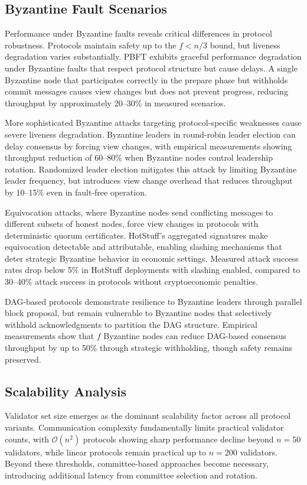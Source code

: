 \subsection{Byzantine Fault Scenarios}

Performance under Byzantine faults reveals critical differences in protocol robustness. Protocols maintain safety up to the $f < n/3$ bound, but liveness degradation varies substantially. PBFT exhibits graceful performance degradation under Byzantine faults that respect protocol structure but cause delays. A single Byzantine node that participates correctly in the prepare phase but withholds commit messages causes view changes but does not prevent progress, reducing throughput by approximately 20--30\% in measured scenarios.

More sophisticated Byzantine attacks targeting protocol-specific weaknesses cause severe liveness degradation. Byzantine leaders in round-robin leader election can delay consensus by forcing view changes, with empirical measurements showing throughput reduction of 60--80\% when Byzantine nodes control leadership rotation. Randomized leader election mitigates this attack by limiting Byzantine leader frequency, but introduces view change overhead that reduces throughput by 10--15\% even in fault-free operation.

Equivocation attacks, where Byzantine nodes send conflicting messages to different subsets of honest nodes, force view changes in protocols with deterministic quorum certificates. HotStuff's aggregated signatures make equivocation detectable and attributable, enabling slashing mechanisms that deter strategic Byzantine behavior in economic settings. Measured attack success rates drop below 5\% in HotStuff deployments with slashing enabled, compared to 30--40\% attack success in protocols without cryptoeconomic penalties.

DAG-based protocols demonstrate resilience to Byzantine leaders through parallel block proposal, but remain vulnerable to Byzantine nodes that selectively withhold acknowledgments to partition the DAG structure. Empirical measurements show that $f$ Byzantine nodes can reduce DAG-based consensus throughput by up to 50\% through strategic withholding, though safety remains preserved.

\subsection{Scalability Analysis}

Validator set size emerges as the dominant scalability factor across all protocol variants. Communication complexity fundamentally limits practical validator counts, with $\mathcal{O}(n^2)$ protocols showing sharp performance decline beyond $n = 50$ validators, while linear protocols remain practical up to $n = 200$ validators. Beyond these thresholds, committee-based approaches become necessary, introducing additional latency from committee selection and rotation.

